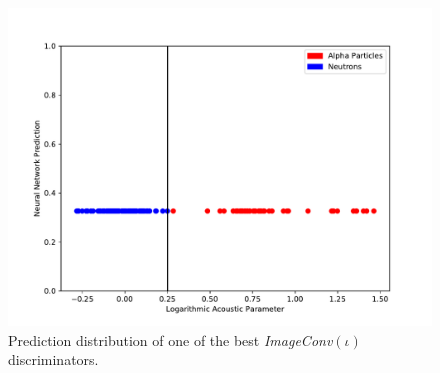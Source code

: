 \documentclass[10pt]{article}
\begin{document}
\begin{figure}[h]
    \centering
    \includegraphics[width=\textwidth]{image_hist}
    \caption{\label{image_hist} Prediction distribution of one of the best {\it ImageConv}$(\iota)$ discriminators.}
\end{figure}
\end{document}

